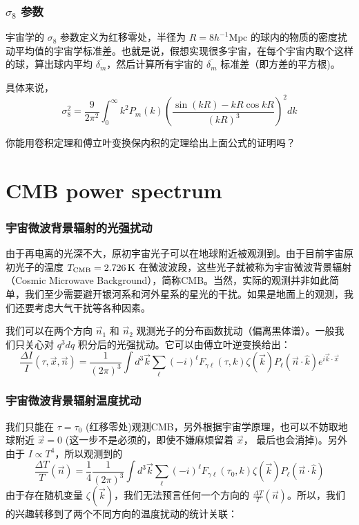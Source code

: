 \documentclass[CJK,13pt]{beamer}
\begin{document}
  \begin{frame}
    \frametitle{$\sigma_8$ 参数}
    宇宙学的 $\sigma_8$ 参数定义为红移零处，半径为 $R = 8h^{-1}\mathrm{Mpc}$ 的球内的物质的密度扰动平均值的宇宙学标准差。也就是说，假想实现很多宇宙，在每个宇宙内取个这样的球，算出球内平均 $\overline{\delta_m}$，然后计算所有宇宙的 $ \overline{\delta_m}$ 标准差（即方差的平方根)。

      具体来说，
      $$\sigma_8^2 = \frac{9}{2\pi^2}\int_0^\infty k^2P_m(k)\left(\frac{\sin(kR)-kR\cos{kR}}{(kR)^3}\right)^2 dk$$

      你能用卷积定理和傅立叶变换保内积的定理给出上面公式的证明吗？


      \skipline

      
  \end{frame}

  
  
  \section{CMB power spectrum}
  

  \begin{frame}
    \frametitle{宇宙微波背景辐射的光强扰动}
    由于再电离的光深不大，原初宇宙光子可以在地球附近被观测到。由于目前宇宙原初光子的温度 $T_{\rm CMB}=2.726\,\mathrm{K}$ 在微波波段，这些光子就被称为宇宙微波背景辐射（Cosmic Microwave Background），简称CMB。当然，实际的观测并非如此简单，我们至少需要避开银河系和河外星系的星光的干扰。如果是地面上的观测，我们还要考虑大气干扰等各种因素。

    \skipline

    我们可以在两个方向 $\vec{n}_1$ 和 $\vec{n}_2$ 观测光子的分布函数扰动（偏离黑体谱）。一般我们只关心对 $q^3dq$ 积分后的光强扰动。它可以由傅立叶逆变换给出：    
    $$\frac{\Delta I}{I}(\tau, \vec{x}, \vec{n}) = \frac{1}{(2\pi)^3}\int d^3\vec{k} \sum_{\ell}(-i)^\ell F_{\gamma\ell}(\tau, k)\zeta(\vec{k}) P_{\ell}(\vec{n}\cdot\hat{k})e^{i\vec{k}\cdot\vec{x}}$$

  \end{frame}

  \begin{frame}
    \frametitle{宇宙微波背景辐射温度扰动}    
    我们只能在 $\tau = \tau_0$ (红移零处)观测CMB，另外根据宇宙学原理，也可以不妨取地球附近 $\vec{x} = 0$ (这一步不是必须的，即使不嫌麻烦留着 $\vec{x}$， 最后也会消掉)。另外由于 $I\propto T^4$，所以观测到的
    $$\frac{\Delta T}{T}(\vec{n}) =\frac{1}{4} \frac{1}{(2\pi)^3}\int d^3\vec{k} \sum_{\ell}(-i)^\ell F_{\gamma\ell}(\tau_0, k)\zeta(\vec{k}) P_{\ell}(\vec{n}\cdot\hat{k}) $$
    由于存在随机变量 $\zeta(\vec{k})$，我们无法预言任何一个方向的 $\frac{\Delta T}{T}(\vec{n})$。所以，我们的兴趣转移到了两个不同方向的温度扰动的统计关联：
  \end{frame}
\end{document}
